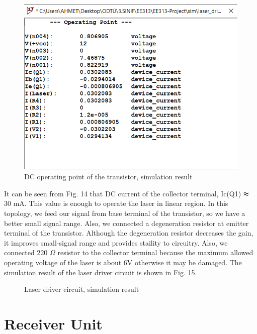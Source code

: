 \documentclass[conference]{IEEEtran}
\begin{document}
 \begin{figure}[H]
   \centerline{\includegraphics[scale=0.5]{DC_operating.png}}
    \caption{DC operating point of the transistor, simulation result}
\end{figure} 
\par It can be seen from Fig. 14 that DC current of the collector terminal, Ic(Q1) \(\thickapprox \) 30 mA. This value is enough to operate the laser in linear region. In this topology, we feed our signal from base terminal of the transistor, so we have a better small signal range. Also, we connected a degeneration resistor at emitter terminal of the transistor. Although the degeneration resistor decreases the gain, it improves small-signal range and provides staility to circuitry. Also, we connected 220 \(\Omega\) resistor to the collector terminal because the maximum allowed operating voltage of the laser is about 6V otherwise it may be damaged. The simulation result of the laser driver circuit is shown in Fig. 15.  
 \begin{figure}[H]
   \centerline{}
    \caption{Laser driver circuit, simulation result}
\end{figure} 

\section{Receiver Unit}
\end{document}

